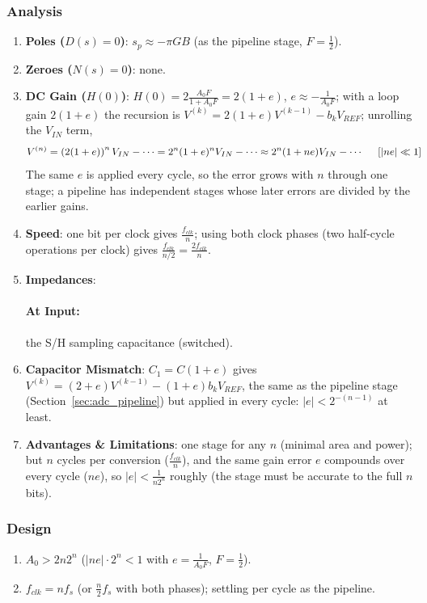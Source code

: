 \subsubsection{Analysis}
\begin{enumerate}
  \item \textbf{Poles (\(D(s) = 0\))}: \(s_p \approx -\pi GB\) (as the pipeline stage, \(F = \frac{1}{2}\)).
  \item \textbf{Zeroes (\(N(s) = 0\))}: none.
  \item \textbf{DC Gain (\(H(0)\))}: \(H(0) = 2\frac{A_0 F}{1 + A_0 F} = 2(1 + e)\), \(e \approx -\frac{1}{A_0 F}\); with a loop gain \(2(1 + e)\) the recursion is
    \(V^{(k)} = 2(1 + e) V^{(k-1)} - b_k V_{REF}\); unrolling the \(V_{IN}\) term,
    \begin{align*}
      V^{(n)} &= \left(2(1 + e)\right)^n V_{IN} - \cdots = 2^n (1 + e)^n V_{IN} - \cdots \approx 2^n (1 + n e) V_{IN} - \cdots \hspace{0.5cm} [|ne| \ll 1]
    \end{align*}
    The same \(e\) is applied every cycle, so the error grows with \(n\)
    through one stage; a pipeline has independent stages whose later errors
    are divided by the earlier gains.
  \item \textbf{Speed}: one bit per clock gives \(\frac{f_{clk}}{n}\); using both clock
    phases (two half-cycle operations per clock) gives
    \(\frac{f_{clk}}{n/2} = \frac{2 f_{clk}}{n}\).
  \item \textbf{Impedances}:
    \paragraph{At Input:} the S/H sampling capacitance (switched).
  \item \textbf{Capacitor Mismatch}: \(C_1 = C(1 + e)\) gives \(V^{(k)} = (2 + e)V^{(k-1)} - (1 + e)b_k V_{REF}\), the same as
    the pipeline stage (Section~\ref{sec:adc_pipeline}) but applied in every cycle: \(|e| < 2^{-(n-1)}\) at least.
  \item \textbf{Advantages \& Limitations}: one stage for any \(n\) (minimal area and power); but \(n\)
    cycles per conversion (\(\frac{f_{clk}}{n}\)), and the same gain error \(e\) compounds over every cycle
    (\(n e\)), so \(|e| < \frac{1}{n 2^{n}}\) roughly (the stage must be accurate to the full \(n\) bits).
\end{enumerate}

\subsubsection{Design}
\begin{enumerate}
  \item \(A_0 > 2 n 2^{n}\) (\(|ne| \cdot 2^n < 1\) with \(e = \frac{1}{A_0 F}\), \(F = \frac{1}{2}\)).
  \item \(f_{clk} = n f_s\) (or \(\frac{n}{2} f_s\) with both phases); settling per cycle as the pipeline.
\end{enumerate}


